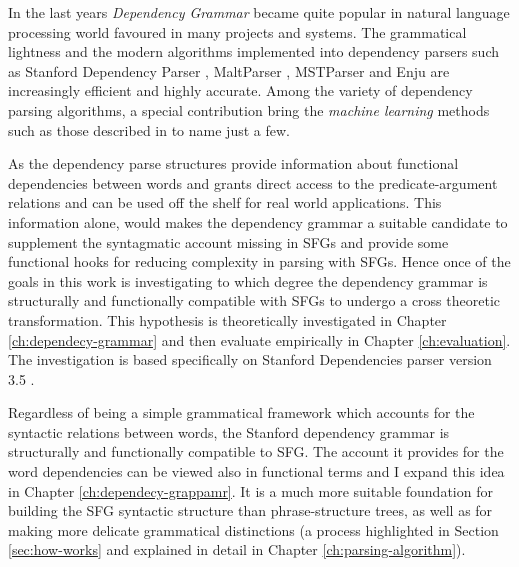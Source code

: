 
%
In the last years \textit{Dependency Grammar} \citep{Tesniere2015} became quite popular in natural language processing world favoured in many projects and systems. The grammatical lightness and the  modern algorithms implemented into dependency parsers such as Stanford Dependency Parser \citep{Marneffe2006}, MaltParser \citep{Nivre2006}, MSTParser \citep{McDonald2006} and Enju \citep{Miyao2005} are increasingly efficient and highly accurate. Among the variety of dependency parsing algorithms, a special contribution bring the \textit{machine learning} methods such as those described in \citet{mcdonald2005online, mcdonald2006online, carreras2007experiments, zhang2011transition, pei2015effective} to name just a few. 

As the dependency parse structures provide information about functional dependencies between words and grants direct access to the predicate-argument relations and can be used off the shelf for real world applications. 
This information alone, would makes the dependency grammar a suitable candidate to supplement the syntagmatic account missing in SFGs and provide some functional hooks for reducing complexity in parsing with SFGs. Hence once of the goals in this work is investigating to which degree the dependency grammar is structurally and functionally compatible with SFGs to undergo a cross theoretic transformation. This hypothesis is theoretically investigated in Chapter \ref{ch:dependecy-grammar} and then evaluate empirically in Chapter \ref{ch:evaluation}. The investigation is based specifically on Stanford Dependencies parser version 3.5 \citep{Marneffe2008a,Marneffe2008, Marneffe2014}. 


Regardless of being a simple grammatical framework which accounts for the syntactic relations between words, the Stanford dependency grammar is structurally and functionally compatible to SFG. 
The account it provides for the word dependencies can be viewed also in functional terms and I expand this idea in Chapter \ref{ch:dependecy-grappamr}. It is a much more suitable foundation for building the SFG syntactic structure than phrase-structure trees, as well as for making more delicate grammatical distinctions (a process highlighted in Section \ref{sec:how-works} and explained in detail in Chapter \ref{ch:parsing-algorithm}).

